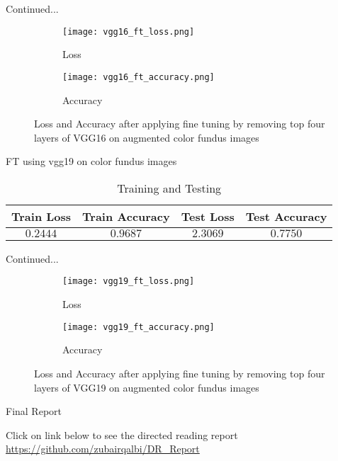 \documentclass{beamer}
\begin{document}
\begin{frame}{Continued...}
\begin{figure}[H]
\centering
\begin{subfigure}[h]{0.45\linewidth}
\texttt{[image: vgg16\_ft\_loss.png]}
\caption{Loss}
\label{fig:a}
\end{subfigure}
\quad
\begin{subfigure}[h]{0.45\linewidth}
\texttt{[image: vgg16\_ft\_accuracy.png]}
\caption{Accuracy}
\label{fig:b}
\end{subfigure}
\caption{Loss and Accuracy after applying fine tuning by removing top four layers of VGG16 on augmented color fundus images}
\label{fig: Image6}
\end{figure}
\end{frame}

\begin{frame}{FT using vgg19 on color fundus images}
\begin{table}
\caption{Training and Testing}
\begin{tabular}{c c c c}
\hline
\textbf{Train Loss} & \textbf{Train Accuracy} & \textbf{Test Loss} & \textbf{Test Accuracy}\\
\hline
$0.2444$ & $0.9687$ & $2.3069$ & $0.7750$\\
\hline
\end{tabular}
\end{table}
\end{frame}

\begin{frame}{Continued...}
\begin{figure}[H]
\centering
\begin{subfigure}[h]{0.45\linewidth}
\texttt{[image: vgg19\_ft\_loss.png]}
\caption{Loss}
\label{fig:a}
\end{subfigure}
\quad
\begin{subfigure}[h]{0.45\linewidth}
\texttt{[image: vgg19\_ft\_accuracy.png]}
\caption{Accuracy}
\label{fig:b}
\end{subfigure}
\caption{Loss and Accuracy after applying fine tuning by removing top four layers of VGG19 on augmented color fundus images}
\label{fig: Image7}
\end{figure}
\end{frame}

\begin{frame}{Final Report}
\begin{center}
\begin{block}{Click on link below to see the directed reading report}
\url{https://github.com/zubairqalbi/DR_Report}
\end{block}
\end{center}

\end{frame}
\end{document}

